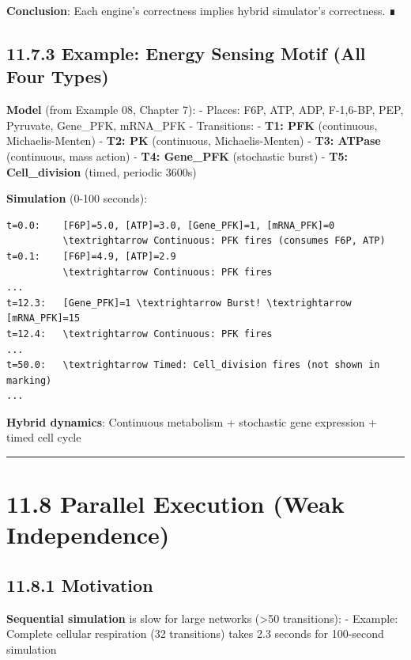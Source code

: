 \textbf{Conclusion}: Each engine's correctness implies hybrid
simulator's correctness. ∎

\hypertarget{example-energy-sensing-motif-all-four-types}{%
\subsection{11.7.3 Example: Energy Sensing Motif (All Four
Types)}\label{example-energy-sensing-motif-all-four-types}}

\textbf{Model} (from Example 08, Chapter 7): - Places: F6P, ATP, ADP,
F-1,6-BP, PEP, Pyruvate, Gene\_PFK, mRNA\_PFK - Transitions: -
\textbf{T1: PFK} (continuous, Michaelis-Menten) - \textbf{T2: PK}
(continuous, Michaelis-Menten) - \textbf{T3: ATPase} (continuous, mass
action) - \textbf{T4: Gene\_PFK} (stochastic burst) - \textbf{T5:
Cell\_division} (timed, periodic 3600s)

\textbf{Simulation} (0-100 seconds):

\begin{lstlisting}
t=0.0:    [F6P]=5.0, [ATP]=3.0, [Gene_PFK]=1, [mRNA_PFK]=0
          \textrightarrow Continuous: PFK fires (consumes F6P, ATP)
t=0.1:    [F6P]=4.9, [ATP]=2.9
          \textrightarrow Continuous: PFK fires
...
t=12.3:   [Gene_PFK]=1 \textrightarrow Burst! \textrightarrow [mRNA_PFK]=15
t=12.4:   \textrightarrow Continuous: PFK fires
...
t=50.0:   \textrightarrow Timed: Cell_division fires (not shown in marking)
...
\end{lstlisting}

\textbf{Hybrid dynamics}: Continuous metabolism + stochastic gene
expression + timed cell cycle

\begin{center}\rule{0.5\linewidth}{0.5pt}\end{center}

\hypertarget{parallel-execution-weak-independence}{%
\section{11.8 Parallel Execution (Weak
Independence)}\label{parallel-execution-weak-independence}}

\hypertarget{motivation}{%
\subsection{11.8.1 Motivation}\label{motivation}}

\textbf{Sequential simulation} is slow for large networks
(\textgreater50 transitions): - Example: Complete cellular respiration
(32 transitions) takes 2.3 seconds for 100-second simulation

